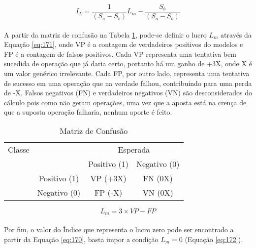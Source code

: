 \begin{equation} \label{eq:170}
    I_{L} = \dfrac{1}{(S_a - S_b)}L_m - \dfrac{S_b}{(S_a - S_b)}
\end{equation}

\paragraph{} A partir da matriz de confusão na Tabela \ref{tab:672}, pode-se definir o lucro \begin{math} L_m \end{math} através da Equação \ref{eq:171}, onde VP é a contagem de verdadeiros positivos do modelos e FP é a contagem de falsos positivos. Cada VP representa uma tentativa bem sucedida de operação que já daria certo, portanto há um ganho de +3X, onde X é um valor genérico irrelevante. Cada FP, por outro lado, representa uma tentativa de sucesso em uma operação que na verdade falhou, contribuindo para uma perda de -X. Falsos negativos (FN) e verdadeiros negativos (VN) são desconsiderados do cálculo pois como não geram operações, uma vez que a aposta está na crença de que a suposta operação falharia, nenhum aporte é feito.

\begin{table}[h!]
    \begin{center}
        \begin{tabular}{ cc|c|c }
                Classe  & & \multicolumn{2}{c}{Esperada} \\
                        & & Positivo (1) & Negativo (0) \\
            \hline
            \parbox[t]{2mm}{} & Positivo (1) & VP (+3X) & FN (0X) \\
            & Negativo (0) & FP (-X) & VN (0X) \\
        \end{tabular}
        \caption{Matriz de Confusão}
        \label{tab:672}
    \end{center}
\end{table}


\begin{equation} \label{eq:171}
    L_m = 3 \times VP - FP
\end{equation}

\paragraph{} Por fim, o valor do Índice que representa o lucro zero pode ser encontrado a partir da Equação \ref{eq:170}, basta impor a condição \begin{math} L_m=0 \end{math} (Equação \ref{eq:172}).

